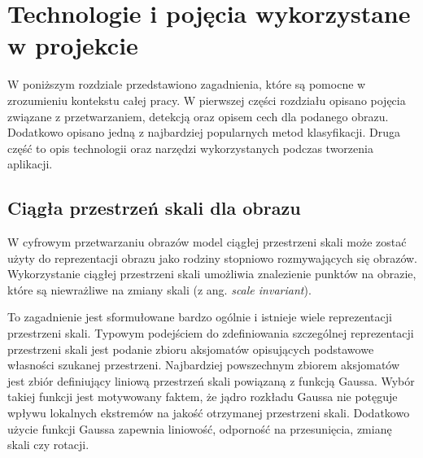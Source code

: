 \chapter{Technologie i pojęcia wykorzystane w projekcie}
\label{cha:Technologie}
W poniższym rozdziale przedstawiono zagadnienia, które są pomocne w zrozumieniu kontekstu całej pracy. W pierwszej części rozdziału opisano pojęcia związane z przetwarzaniem, detekcją oraz opisem cech dla podanego obrazu. Dodatkowo opisano jedną z najbardziej popularnych metod klasyfikacji. Druga część to opis technologii oraz narzędzi wykorzystanych podczas tworzenia aplikacji.

\section{Ciągła przestrzeń skali dla obrazu}
\label{sec:StateSpace}
W cyfrowym przetwarzaniu obrazów model ciągłej przestrzeni skali może zostać użyty do reprezentacji obrazu jako rodziny stopniowo rozmywających się obrazów. Wykorzystanie ciągłej przestrzeni skali umożliwia znalezienie punktów na obrazie, które są niewrażliwe na zmiany skali (z ang. \textit{scale invariant}).


To zagadnienie jest sformułowane bardzo ogólnie i istnieje wiele reprezentacji przestrzeni skali. Typowym podejściem do zdefiniowania szczególnej reprezentacji przestrzeni skali jest podanie zbioru aksjomatów opisujących podstawowe własności szukanej przestrzeni. Najbardziej powszechnym zbiorem aksjomatów jest zbiór definiujący liniową przestrzeń skali powiązaną z funkcją Gaussa. Wybór takiej funkcji jest motywowany faktem, że jądro rozkładu Gaussa nie potęguje wpływu lokalnych ekstremów na jakość otrzymanej przestrzeni skali. Dodatkowo użycie funkcji Gaussa zapewnia liniowość, odporność na przesunięcia, zmianę skali czy rotacji.

